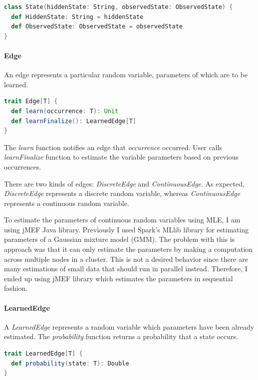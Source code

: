 \documentclass[thesis=B,english]{FITthesis}[2012/06/26]
\begin{document}
\begin{lstlisting}[language=Scala]
class State(hiddenState: String, observedState: ObservedState) {
  def HiddenState: String = hiddenState
  def ObservedState: ObservedState = observedState
}
\end{lstlisting}

\paragraph{Edge}

An edge represents a particular random variable, parameters of which are to be learned.

\begin{lstlisting}[language=Scala]
trait Edge[T] {
  def learn(occurrence: T): Unit
  def learnFinalize(): LearnedEdge[T]
}
\end{lstlisting}

The \textit{learn} function notifies an edge that \textit{occurrence} occurred. User calls \textit{learnFinalize} function to estimate the variable parameters based on previous occurrences.

There are two kinds of edges: \textit{DiscreteEdge} and \textit{ContinuousEdge}. As expected, \textit{DiscreteEdge} represents a discrete random variable, whereas \textit{ContinuousEdge} represents a continuous random variable.

To estimate the parameters of continuous random variables using MLE, I am using jMEF Java library. Previously I used Spark's MLlib library for estimating parameters of a Gaussian mixture model (GMM). The problem with this is approach was that it can only estimate the parameters by making a computation across multiple nodes in a cluster. This is not a desired behavior since there are many estimations of small data that should run in parallel instead. Therefore, I ended up using jMEF library which estimates the parameters in sequential fashion.

\paragraph{LearnedEdge}

A \textit{LearnedEdge} represents a random variable which parameters have been already estimated. The \textit{probability} function returns a probability that a state occurs.

\begin{lstlisting}[language=Scala]
trait LearnedEdge[T] {
  def probability(state: T): Double
}
\end{lstlisting}
\end{document}
